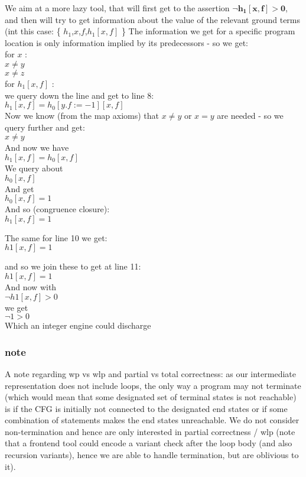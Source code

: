 We aim at a more lazy tool, that will first get to the assertion $\mathbf{\lnot h_1[x,f] > 0}$, and then will try to get information about the value of the relevant ground terms (int this case: \{ $h_1$,$x$,$f$,$h_1[x,f]$ \}
The information we get for a specific program location is only information implied by its predecessors - so we get: \\
	for $x$ : \\
	$x \neq y $ \\
	$x \neq z $ \\
	for $h_1[x,f]$ : \\
	we query down the line and get to line 8: \\
	$h_1[x,f] = h_0[y.f := -1][x,f]$ \\
	Now we know (from the map axioms) that $x \neq y$ or $x = y$ are needed - so we query further and get: \\
	$x \neq y $ \\
	And now we have \\
	$h_1[x,f] = h_0[x,f]$ \\
	We query about  \\
	$h_0[x,f]$ \\
	And get \\
	$h_0[x,f]=1$ \\
	And so (congruence closure): \\
	$h_1[x,f]=1$
	
	The same for line 10 we get: \\
	$h1[x,f]=1$
	
	and so we join these to get at line 11: \\
	$h1[x,f]=1$ \\
	And now with \\
	$\lnot h1[x,f]>0$ \\
	we get \\
	$\lnot 1>0$ \\ 
	Which an integer engine could discharge 

\subsubsection{note}
A note regarding wp vs wlp and partial vs total correctness: as our intermediate representation does not include loops, the only way a program may not terminate (which would mean that some designated set of terminal states is not reachable) is if the CFG is initially not connected to the designated end states or if some combination of  statements makes the end states unreachable.
We do not consider non-termination and hence are only interested in partial correctness / wlp (note that a frontend tool could encode a variant check after the loop body (and also recursion variants), hence we are able to handle termination, but are oblivious to it).
